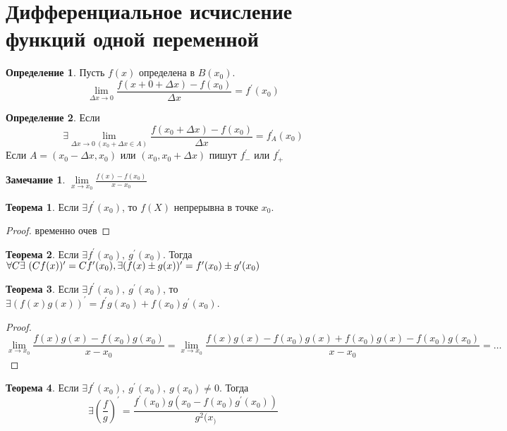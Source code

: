\documentclass[a4paper, 12pt]{article}
\theoremstyle{definition}
\newtheorem*{definition}{Определение}
\newtheorem*{theorem}{Теорема}
\newtheorem*{comm}{Замечание}
\begin{document}
        \section{Дифференциальное исчисление функций одной переменной}
        \begin{definition}
            Пусть $f(x)$ определена в $B(x_0)$.
             \[\lim\limits_{\Delta x\to 0}\frac{f(x+0+\Delta x)-f(x_0)}{\Delta x}=f^{\prime}(x_0)\]
        \end{definition} 
        \begin{definition}
            Если \[\exists \lim\limits_{\Delta x\to 0\ (x_0+\Delta x\in A)}\frac{f(x_0+\Delta x)-f(x_0)}{\Delta x}=f_A^{\prime}(x_0)\]
            Если $A=(x_0-\Delta x, x_0)$ или $(x_0,x_0+\Delta x)$ пишут $f_{-}^{\prime}$ или $f_{+}^{\prime}$ 
        \end{definition} 
        \begin{comm}
            $\lim\limits_{x\to x_0}\frac{f(x)-f(x_0)}{x-x_0}$
        \end{comm} 
        \begin{theorem}
            Если $\exists f^{\prime}(x_0)$, то $f(X)$ непрерывна в точке $x_0$.
        \end{theorem} 
        \begin{proof}
            временно очев
        \end{proof}
        \begin{theorem}
            Если $\exists f^{\prime}(x_0),\ g^{\prime}(x_0)$. Тогда $\forall C\\
            \exists\ (Cf(x))^{\prime}=C f^{\prime}(x_0),\\
            \exists (f(x)\pm g(x))^{\prime}=f^{\prime}(x_0)\pm g^{\prime}(x_0)$
        \end{theorem} 
        \begin{theorem}
            Если $\exists f^{\prime}(x_0),\ g^{\prime}(x_0)$, то $\exists (f(x)g(x))^{\prime}=f^{\prime}g(x_0)+f(x_0)g^{\prime}(x_0)$.
        \end{theorem} 
        \begin{proof}
            \[\lim\limits_{x\to x_0}\frac{f(x)g(x)-f(x_0)g(x_0)}{x-x_0}=\lim\limits_{x\to x_0}\frac{f(x)g(x)-f(x_0)g(x)+f(x_0)g(x)-f(x_0)g(x_0)}{x-x_0}=\dots\]
        \end{proof} 
        \begin{theorem}
            Если $\exists f^{\prime}(x_0),\ g^{\prime}(x_0),\ g(x_0)\ne 0$. Тогда
            \[\exists (\frac{f}{g})^{\prime}=\frac{f^{\prime}(x_0)g(x_0-f(x_0)g^{\prime}(x_0))}{g^2(x_)}\]
        \end{theorem} 
\end{document}
